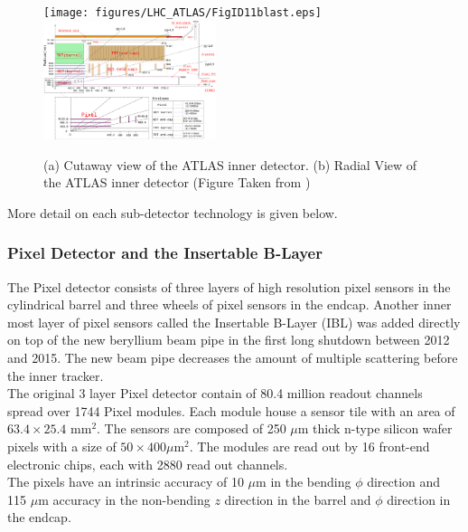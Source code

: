 \begin{figure}[h!]
\centering
\texttt{[image: figures/LHC\_ATLAS/FigID11blast.eps]}
\includegraphics[width=0.45\textwidth, angle=0]{figures/LHC_ATLAS/FigID26-mod-011107.eps}
\caption{ (a) Cutaway view of the ATLAS inner detector. (b) Radial View of the ATLAS inner detector (Figure Taken from \cite{ATLAS_JINST}) \label{LHC:fig:ATLASID}}
\end{figure}

\indent More detail on each sub-detector technology is given below. \\

\subsubsection*{ Pixel Detector and the Insertable B-Layer}

\indent The Pixel detector consists of three layers of high resolution pixel sensors in the cylindrical barrel and three wheels of pixel sensors in the endcap.  Another inner most layer of pixel sensors called the Insertable B-Layer (IBL) was added directly on top of the new beryllium beam pipe in the first long shutdown between 2012 and 2015.  The new beam pipe decreases the amount of multiple scattering before the inner tracker. \\

\indent The original 3 layer Pixel detector contain of 80.4 million readout channels spread over 1744 Pixel modules.  Each module house a sensor tile with an area of $63.4 \times 25.4$ mm$^2$.  The sensors are composed of 250 $\mu$m thick n-type silicon wafer pixels with a size of $50\times400 \mu$m$^2$. The modules are read out by 16 front-end electronic chips, each with 2880 read out channels. \\

\indent The pixels have an intrinsic accuracy of 10 $\mu$m in the bending $\phi$ direction and 115 $\mu$m accuracy in the non-bending $z$ direction in the barrel and $\phi$ direction in the endcap.\\ 

